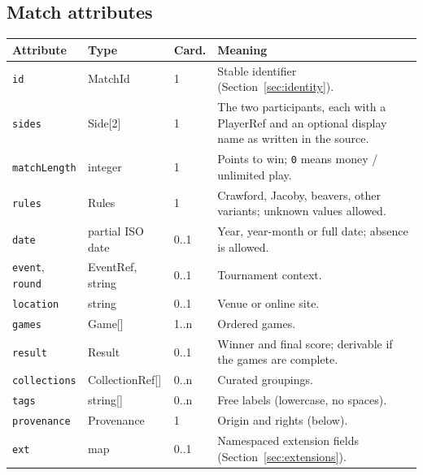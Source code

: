 \documentclass[11pt,a4paper]{article}
\begin{document}
\subsection{Match attributes}
\begin{longtable}{@{}p{3.1cm}p{2.5cm}p{1.2cm}p{7.2cm}@{}}
\toprule
\textbf{Attribute} & \textbf{Type} & \textbf{Card.} & \textbf{Meaning}\\
\midrule
\endhead
\texttt{id} & MatchId & 1 & Stable identifier (Section~\ref{sec:identity}).\\
\texttt{sides} & Side[2] & 1 & The two participants, each with a PlayerRef and an optional display name as written in the source.\\
\texttt{matchLength} & integer & 1 & Points to win; \texttt{0} means money / unlimited play.\\
\texttt{rules} & Rules & 1 & Crawford, Jacoby, beavers, other variants; unknown values allowed.\\
\texttt{date} & partial ISO date & 0..1 & Year, year-month or full date; absence is allowed.\\
\texttt{event}, \texttt{round} & EventRef, string & 0..1 & Tournament context.\\
\texttt{location} & string & 0..1 & Venue or online site.\\
\texttt{games} & Game[] & 1..n & Ordered games.\\
\texttt{result} & Result & 0..1 & Winner and final score; derivable if the games are complete.\\
\texttt{collections} & CollectionRef[] & 0..n & Curated groupings.\\
\texttt{tags} & string[] & 0..n & Free labels (lowercase, no spaces).\\
\texttt{provenance} & Provenance & 1 & Origin and rights (below).\\
\texttt{ext} & map & 0..1 & Namespaced extension fields (Section~\ref{sec:extensions}).\\
\bottomrule
\end{longtable}
\end{document}

